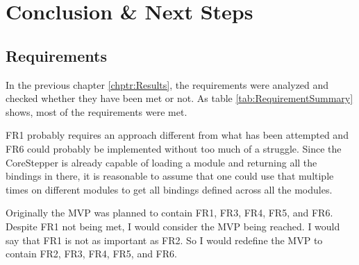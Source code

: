 \chapter{Conclusion \& Next Steps}

\section{Requirements}

In the previous chapter \ref*{chptr:Results},
the requirements were analyzed and checked whether they have been met or not.
As table \ref*{tab:RequirementSummary} shows,
most of the requirements were met.

FR1 probably requires an approach different from what has been attempted
and FR6 could probably be implemented without too much of a struggle.
Since the CoreStepper is already capable of loading a module and returning all the bindings in there,
it is reasonable to assume that one could use that multiple times on different modules to get all bindings defined across all the modules.

\begin{table}[ht!]
    \caption{Summary of which requirements have been met and which have not.}
    \label{tab:RequirementSummary}
\end{table}

Originally the MVP was planned to contain FR1, FR3, FR4, FR5, and FR6.
Despite FR1 not being met, I would consider the MVP being reached.
I would say that FR1 is not as important as FR2.
So I would redefine the MVP to contain FR2, FR3, FR4, FR5, and FR6.


